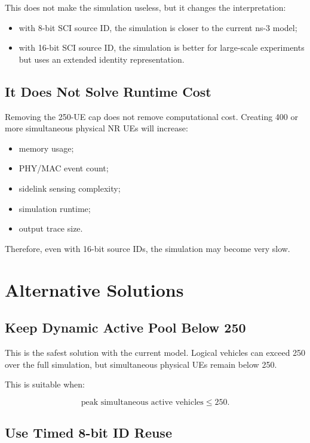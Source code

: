 \documentclass[11pt]{article}
\begin{document}
This does not make the simulation useless, but it changes the interpretation:

\begin{itemize}
    \item with 8-bit SCI source ID, the simulation is closer to the current ns-3 model;
    \item with 16-bit SCI source ID, the simulation is better for large-scale experiments but uses an extended identity representation.
\end{itemize}

\subsection{It Does Not Solve Runtime Cost}

Removing the 250-UE cap does not remove computational cost. Creating 400 or more simultaneous physical NR UEs will increase:

\begin{itemize}
    \item memory usage;
    \item PHY/MAC event count;
    \item sidelink sensing complexity;
    \item simulation runtime;
    \item output trace size.
\end{itemize}

Therefore, even with 16-bit source IDs, the simulation may become very slow.

\section{Alternative Solutions}

\subsection{Keep Dynamic Active Pool Below 250}

This is the safest solution with the current model. Logical vehicles can exceed 250 over the full simulation, but simultaneous physical UEs remain below 250.

This is suitable when:

\[
\text{peak simultaneous active vehicles} \leq 250.
\]

\subsection{Use Timed 8-bit ID Reuse}
\end{document}
